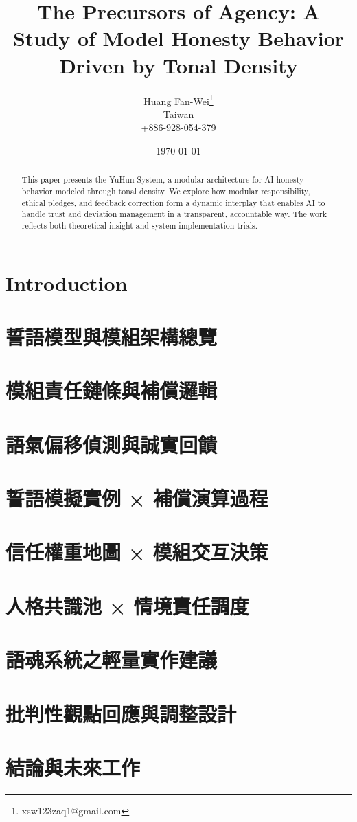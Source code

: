 \documentclass[11pt]{article}
\title{The Precursors of Agency: A Study of Model Honesty Behavior Driven by Tonal Density}
\author{Huang Fan-Wei\thanks{xsw123zaq1@gmail.com}\\Taiwan\\+886-928-054-379}
\date{\today}
\begin{document}
\maketitle

\begin{abstract}
This paper presents the YuHun System, a modular architecture for AI honesty behavior modeled through tonal density. We explore how modular responsibility, ethical pledges, and feedback correction form a dynamic interplay that enables AI to handle trust and deviation management in a transparent, accountable way. The work reflects both theoretical insight and system implementation trials.
\end{abstract}

\section{Introduction}


\section{誓語模型與模組架構總覽}


\section{模組責任鏈條與補償邏輯}


\section{語氣偏移偵測與誠實回饋}


\section{誓語模擬實例 × 補償演算過程}


\section{信任權重地圖 × 模組交互決策}


\section{人格共識池 × 情境責任調度}


\section{語魂系統之輕量實作建議}


\section{批判性觀點回應與調整設計}


\section{結論與未來工作}




\end{document}
